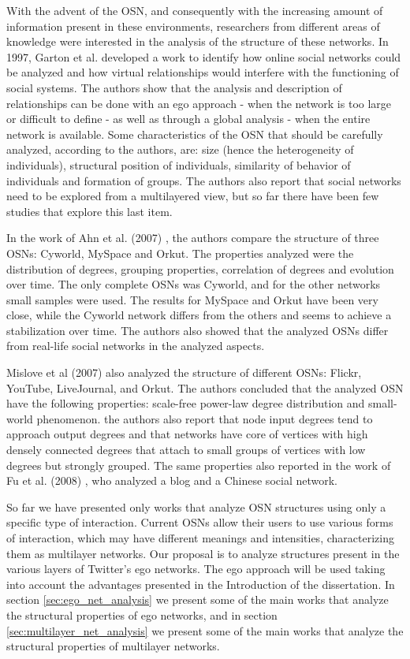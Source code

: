 With the advent of the OSN, and consequently with the increasing amount of information present in these environments, researchers from different areas of knowledge were interested in the analysis of the structure of these networks. In 1997, Garton et al. \cite {Garton1997} developed a work to identify how online social networks could be analyzed and how virtual relationships would interfere with the functioning of social systems. The authors show that the analysis and description of relationships can be done with an ego approach - when the network is too large or difficult to define - as well as through a global analysis - when the entire network is available. Some characteristics of the OSN that should be carefully analyzed, according to the authors, are: size (hence the heterogeneity of individuals), structural position of individuals, similarity of behavior of individuals and formation of groups. The authors also report that social networks need to be explored from a multilayered view, but so far there have been few studies that explore this last item.

In the work of Ahn et al. (2007) \cite{Ahn2007}, the authors compare the structure of three OSNs: Cyworld, MySpace and Orkut. The properties analyzed were the distribution of degrees, grouping properties, correlation of degrees and evolution over time. The only complete OSNs was Cyworld, and for the other networks small samples were used. The results for MySpace and Orkut have been very close, while the Cyworld network differs from the others and seems to achieve a stabilization over time. The authors also showed that the analyzed OSNs differ from real-life social networks in the analyzed aspects.

Mislove et al (2007) \cite{Mislove2007} also analyzed the structure of different OSNs: Flickr, YouTube, LiveJournal, and Orkut. The authors concluded that the analyzed OSN have the following properties: scale-free power-law degree distribution and small-world phenomenon. the authors also report that node input degrees tend to approach output degrees and that networks have core of vertices with high densely connected degrees that attach to small groups of vertices with low degrees but strongly grouped. The same properties also reported in the work of Fu et al. (2008) \cite{Fu2008}, who analyzed a blog and a Chinese social network.

So far we have presented only works that analyze OSN structures using only a specific type of interaction. Current OSNs allow their users to use various forms of interaction, which may have different meanings and intensities, characterizing them as multilayer networks. Our proposal is to analyze structures present in the various layers of Twitter's ego networks. The ego approach will be used taking into account the advantages presented in the Introduction of the dissertation. In section \ref{sec:ego_net_analysis} we present some of the main works that analyze the structural properties of ego networks, and in section \ref{sec:multilayer_net_analysis} we present some of the main works that analyze the structural properties of multilayer networks.


